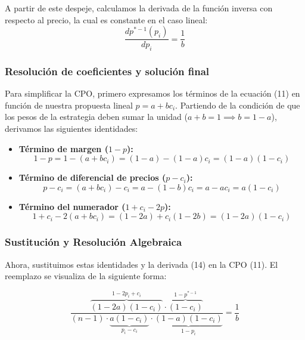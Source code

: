 \documentclass[12pt]{article}
\begin{document}
A partir de este despeje, calculamos la derivada de la función inversa con respecto al precio, la cual es constante en el caso lineal:
\begin{equation}
    \frac{d p^{*-1}(p_i)}{d p_i} = \frac{1}{b}
\end{equation}

\subsubsection{Resolución de coeficientes y solución final}

Para simplificar la CPO, primero expresamos los términos de la ecuación (11) en función de nuestra propuesta lineal $p = a + bc_i$. Partiendo de la condición de que los pesos de la estrategia deben sumar la unidad ($a + b = 1 \implies b = 1 - a$), derivamos las siguientes identidades:

\begin{itemize}
    \item \textbf{Término de margen ($1-p$):}
    \begin{equation}
        1 - p = 1 - (a + bc_i) = (1 - a) - (1 - a)c_i = (1 - a)(1 - c_i)
    \end{equation}
    
    \item \textbf{Término de diferencial de precios ($p-c_i$):}
    \begin{equation}
        p - c_i = (a + bc_i) - c_i = a - (1 - b)c_i = a - ac_i = a(1 - c_i)
    \end{equation}
    
    \item \textbf{Término del numerador ($1 + c_i - 2p$):}
    \begin{equation}
        1 + c_i - 2(a + bc_i) = (1 - 2a) + c_i(1 - 2b) = (1 - 2a)(1 - c_i)
    \end{equation}
\end{itemize}

\subsubsection{Sustitución y Resolución Algebraica}

Ahora, sustituimos estas identidades y la derivada (14) en la CPO (11). El reemplazo se visualiza de la siguiente forma:

\begin{equation}
    \frac{\overbrace{(1 - 2a)(1 - c_i)}^{1 - 2p_i + c_i} \cdot \overbrace{(1 - c_i)}^{1 - p^{*-1}}}{(n - 1) \cdot \underbrace{a(1 - c_i)}_{p_i - c_i} \cdot \underbrace{(1 - a)(1 - c_i)}_{1 - p_i}} = \frac{1}{b}
\end{equation}
\end{document}
